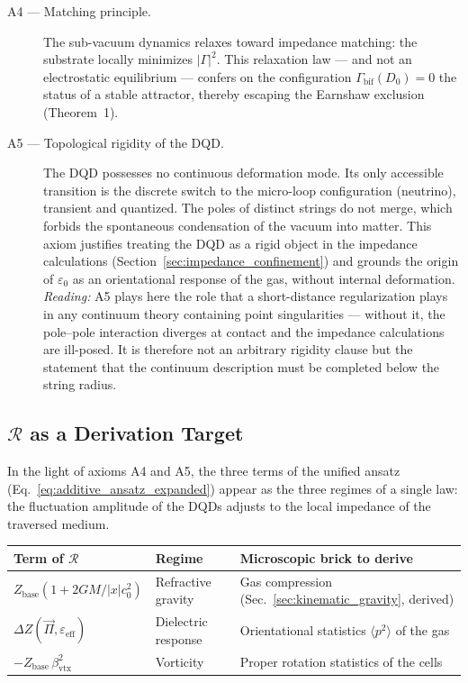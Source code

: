 \documentclass[11pt,a4paper]{article}
\theoremstyle{plain}
\theoremstyle{remark}
\begin{document}
\begin{description}
\item[A4 --- Matching principle.] The sub-vacuum dynamics relaxes toward impedance matching: the substrate locally minimizes $|\Gamma|^2$. This relaxation law --- and not an electrostatic equilibrium --- confers on the configuration $\Gamma_{\text{bif}}(D_0)=0$ the status of a stable attractor, thereby escaping the Earnshaw exclusion (Theorem~1).
\item[A5 --- Topological rigidity of the DQD.] The DQD possesses no continuous deformation mode. Its only accessible transition is the discrete switch to the micro-loop configuration (neutrino), transient and quantized. The poles of distinct strings do not merge, which forbids the spontaneous condensation of the vacuum into matter. This axiom justifies treating the DQD as a rigid object in the impedance calculations (Section~\ref{sec:impedance_confinement}) and grounds the origin of $\varepsilon_0$ as an orientational response of the gas, without internal deformation. \emph{Reading:} A5 plays here the role that a short-distance regularization plays in any continuum theory containing point singularities --- without it, the pole--pole interaction diverges at contact and the impedance calculations are ill-posed. It is therefore not an arbitrary rigidity clause but the statement that the continuum description must be completed below the string radius.
\end{description}

\subsection{$\mathcal{R}$ as a Derivation Target}

In the light of axioms A4 and A5, the three terms of the unified ansatz (Eq.~\ref{eq:additive_ansatz_expanded}) appear as the three regimes of a single law: the fluctuation amplitude of the DQDs adjusts to the local impedance of the traversed medium.

\begin{center}
\begin{tabular}{lll}
\toprule
\textbf{Term of $\mathcal{R}$} & \textbf{Regime} & \textbf{Microscopic brick to derive} \\
\midrule
$Z_{\text{base}}(1+2GM/|x|c_0^2)$ & Refractive gravity & Gas compression (Sec.~\ref{sec:kinematic_gravity}, derived) \\
$\Delta Z(\vec{\Pi},\varepsilon_{\text{eff}})$ & Dielectric response & Orientational statistics $\langle p^2\rangle$ of the gas \\
$-Z_{\text{base}}\,\beta_{\text{vtx}}^2$ & Vorticity & Proper rotation statistics of the cells \\
\bottomrule
\end{tabular}
\end{center}
\end{document}
